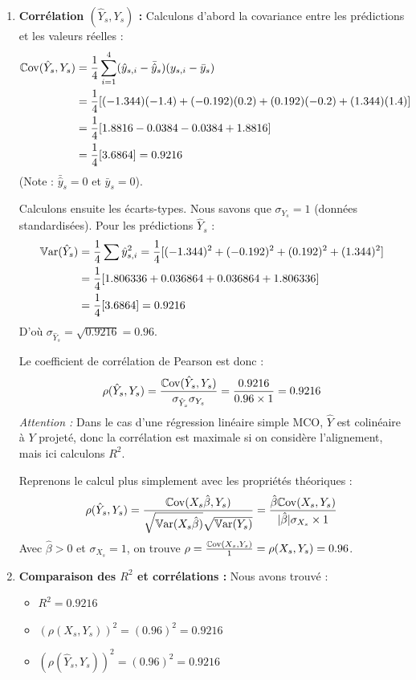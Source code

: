 \documentclass[solutions]{../exercices}
\begin{document}
\begin{solution}
\begin{enumerate}
\begin{itemize}
			\item \textbf{Calcul du $R^2$ :}
			\[ R^2 = 1 - \frac{0.3136}{4} = 1 - 0.0784 = 0.9216 \]
		\end{itemize}

		\item \textbf{Corrélation $(\hat{Y}_s, Y_s)$ :}
		Calculons d'abord la covariance entre les prédictions et les valeurs réelles :
		\[
		\begin{aligned}
			\mathbb{C}\mathrm{ov}(\hat{Y}_s, Y_s) &= \frac{1}{4} \sum_{i=1}^4 (\hat{y}_{s,i} - \bar{\hat{y}}_s)(y_{s,i} - \bar{y}_s) \\
			&= \frac{1}{4} [ (-1.344)(-1.4) + (-0.192)(0.2) + (0.192)(-0.2) + (1.344)(1.4) ] \\
			&= \frac{1}{4} [ 1.8816 - 0.0384 - 0.0384 + 1.8816 ] \\
			&= \frac{1}{4} [ 3.6864 ] = 0.9216
		\end{aligned}
		\]
		(Note : $\bar{\hat{y}}_s = 0$ et $\bar{y}_s = 0$).

		Calculons ensuite les écarts-types. Nous savons que $\sigma_{Y_s} = 1$ (données standardisées).
		Pour les prédictions $\hat{Y}_s$ :
		\[
		\begin{aligned}
			\mathbb{V}\mathrm{ar}(\hat{Y}_s) &= \frac{1}{4} \sum \hat{y}_{s,i}^2 = \frac{1}{4} [ (-1.344)^2 + (-0.192)^2 + (0.192)^2 + (1.344)^2 ] \\
			&= \frac{1}{4} [ 1.806336 + 0.036864 + 0.036864 + 1.806336 ] \\
			&= \frac{1}{4} [ 3.6864 ] = 0.9216
		\end{aligned}
		\]
		D'où $\sigma_{\hat{Y}_s} = \sqrt{0.9216} = 0.96$.

		Le coefficient de corrélation de Pearson est donc :
		\[ \rho(\hat{Y}_s, Y_s) = \frac{\mathbb{C}\mathrm{ov}(\hat{Y}_s, Y_s)}{\sigma_{\hat{Y}_s} \sigma_{Y_s}} = \frac{0.9216}{0.96 \times 1} = 0.9216 \]
		\textit{Attention :} Dans le cas d'une régression linéaire simple MCO, $\hat{Y}$ est colinéaire à $Y$ projeté, donc la corrélation est maximale si on considère l'alignement, mais ici calculons $R^2$.

		Reprenons le calcul plus simplement avec les propriétés théoriques :
		\[ \rho(\hat{Y}_s, Y_s) = \frac{\mathbb{C}\mathrm{ov}(X_s \hat{\beta}, Y_s)}{\sqrt{\mathbb{V}\mathrm{ar}(X_s \hat{\beta})} \sqrt{\mathbb{V}\mathrm{ar}(Y_s)}} = \frac{\hat{\beta} \mathbb{C}\mathrm{ov}(X_s, Y_s)}{|\hat{\beta}| \sigma_{X_s} \times 1} \]
		Avec $\hat{\beta} > 0$ et $\sigma_{X_s}=1$, on trouve $\rho = \frac{\mathbb{C}\mathrm{ov}(X_s, Y_s)}{1} = \rho(X_s, Y_s) = 0.96$.

		\item \textbf{Comparaison des $R^2$ et corrélations :}
		Nous avons trouvé :
		\begin{itemize}
			\item $R^2 = 0.9216$
			\item $(\rho(X_s, Y_s))^2 = (0.96)^2 = 0.9216$
			\item $(\rho(\hat{Y}_s, Y_s))^2 = (0.96)^2 = 0.9216$
		\end{itemize}


\end{enumerate}
\end{solution}
\end{document}
